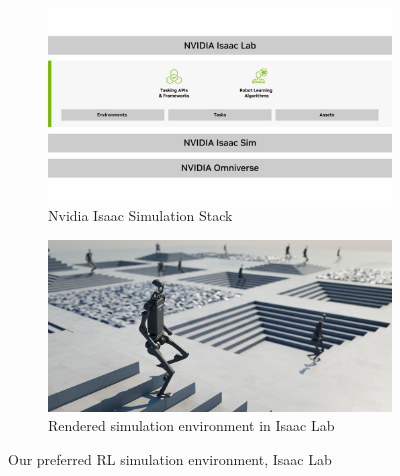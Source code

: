 \documentclass{article}
\begin{document}
\begin{figure}[htbp]
\centering
\begin{subfigure}{0.48\columnwidth}
  \includegraphics[width=\linewidth]{../figures/isaac_lab_stack.jpg}
  \caption*{Nvidia Isaac Simulation Stack}
\end{subfigure}
\hfill
\begin{subfigure}{0.48\columnwidth}
  \includegraphics[width=\linewidth]{../figures//isaac_lab.jpg}
  \caption*{Rendered simulation environment in Isaac Lab}
\end{subfigure}
\caption{Our preferred RL simulation environment, Isaac Lab}
\label{fig:isaac-sim}
\end{figure}
\end{document}
